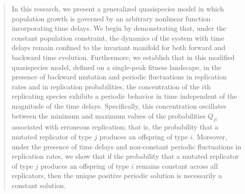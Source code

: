 \documentclass[11pt,reqno]{amsart}
\theoremstyle{definition}
\begin{document}
\begin{abstract}
In this research, we present a generalized quasispecies model in which population growth is governed by an arbitrary nonlinear function incorporating time delays.
We begin by demonstrating that, under the constant population constraint, the dynamics of the system with time delays remain confined to the invariant manifold for both forward and backward time evolution. Furthermore, we establish that in this modified quasispecies model, defined on a single-peak fitness landscape, in the presence of backward mutation and periodic fluctuations in replication rates and in replication probabilities,  the concentration of the \(i\)th replicating species exhibits a periodic behavior in time  independent of the magnitude of the time delays. Specifically, this concentration oscillates between the minimum and maximum values of the probabilities \(Q_{ji}\) associated with erroneous replication; that is, the probability that a mutated replicator of type \(j\) produces an offspring of type \(i\). Moreover, under the presence of time delays and non-constant periodic fluctuations in replication rates, we show that if the probability that a mutated replicator of type \(j\) produces an offspring of type \(i\) remains constant across all replicators, then the unique positive periodic solution is necessarily a constant solution.
\end{abstract}






\maketitle
\end{document}
